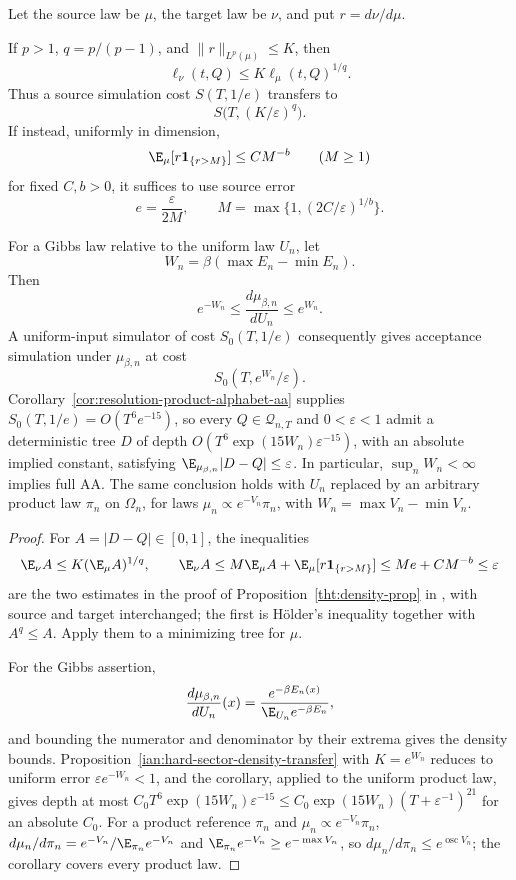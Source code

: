 \begin{proposition}
\label{ian:hard-sector-likelihood-reconciliation}
Let the source law be \(\mu\), the target law be \(\nu\), and put
\(r=d\nu/d\mu\).

If \(p>1\), \(q=p/(p-1)\), and
\(\|r\|_{L^p(\mu)}\le K\), then
\[
 \ell_\nu(t,Q)\le K\ell_\mu(t,Q)^{1/q}.
\]
Thus a source simulation cost \(S(T,1/e)\) transfers to
\[
 S\bigl(T,(K/\varepsilon)^q\bigr).
\]
If instead, uniformly in dimension,
\[
 \E_\mu[r\mathbf1_{\{r>M\}}]\le CM^{-b}
 \qquad(M\ge1)
\]
for fixed \(C,b>0\), it suffices to use source error
\[
 e=\frac{\varepsilon}{2M},\qquad
 M=\max\{1,(2C/\varepsilon)^{1/b}\}.
\]

For a Gibbs law relative to the uniform law \(U_n\), let
\[
 W_n=\beta(\max E_n-\min E_n).
\]
Then
\[
 e^{-W_n}\le\frac{d\mu_{\beta,n}}{dU_n}\le e^{W_n}.
\]
A uniform-input simulator of cost \(S_0(T,1/e)\) consequently gives
acceptance simulation under \(\mu_{\beta,n}\) at cost
\[
 S_0(T,e^{W_n}/\varepsilon).
\]
Corollary~\ref{cor:resolution-product-alphabet-aa} supplies
\(S_0(T,1/e)=O(T^6e^{-15})\), so every \(Q\in\mathcal Q_{n,T}\) and
\(0<\varepsilon<1\) admit a deterministic tree \(D\) of depth
\(O(T^6\exp(15W_n)\varepsilon^{-15})\), with an absolute implied constant,
satisfying \(\E_{\mu_{\beta,n}}|D-Q|\le\varepsilon\). In particular,
\(\sup_nW_n<\infty\) implies full AA. The same conclusion holds with
\(U_n\) replaced by an arbitrary product law \(\pi_n\) on \(\Omega_n\),
for laws \(\mu_n\propto e^{-V_n}\pi_n\), with \(W_n=\max V_n-\min V_n\).
\end{proposition}

\begin{proof}
For \(A=|D-Q|\in[0,1]\), the inequalities
\[
 \E_\nu A\le K(\E_\mu A)^{1/q},\qquad
 \E_\nu A
 \le M\E_\mu A+\E_\mu[r\mathbf1_{\{r>M\}}]
 \le Me+CM^{-b}\le\varepsilon
\]
are the two estimates in the proof of Proposition~\ref{tht:density-prop}
in , with source
and target interchanged; the first is H\"older's inequality together
with \(A^q\le A\). Apply them to a minimizing tree for \(\mu\).

For the Gibbs assertion,
\[
 \frac{d\mu_{\beta,n}}{dU_n}(x)
 =\frac{e^{-\beta E_n(x)}}{\E_{U_n}e^{-\beta E_n}},
\]
and bounding the numerator and denominator by their extrema gives
the density bounds. Proposition~\ref{ian:hard-sector-density-transfer}
with \(K=e^{W_n}\) reduces to uniform error
\(\varepsilon e^{-W_n}<1\), and the corollary, applied to the uniform
product law, gives depth at most
\(C_0T^6\exp(15W_n)\varepsilon^{-15}\le C_0\exp(15W_n)(T+\varepsilon^{-1})^{21}\)
for an absolute \(C_0\). For a product reference \(\pi_n\) and
\(\mu_n\propto e^{-V_n}\pi_n\), \(d\mu_n/d\pi_n=e^{-V_n}/\E_{\pi_n}e^{-V_n}\)
and \(\E_{\pi_n}e^{-V_n}\ge e^{-\max V_n}\), so
\(d\mu_n/d\pi_n\le e^{\operatorname{osc}V_n}\); the corollary covers
every product law.
\end{proof}

